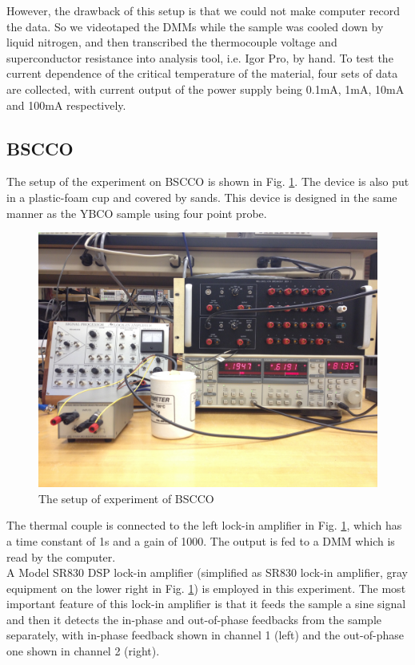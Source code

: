 \documentclass[prb,preprint]{revtex4-1}
\begin{document}
However, the drawback of this setup is that we could not make computer record the data. So we videotaped the DMMs while the sample was cooled down by liquid nitrogen, and then transcribed the thermocouple voltage and superconductor resistance into analysis tool, i.e. Igor Pro, by hand. To test the current dependence of the critical temperature of the material, four sets of data are collected, with current output of the power supply being 0.1mA, 1mA, 10mA and 100mA respectively.\\

\subsection{BSCCO}

The setup of the experiment on BSCCO is shown in Fig. \ref{bsccosetup}. The device is also put in a plastic-foam cup and covered by sands. This device is designed in the same manner as the YBCO sample using four point probe.

\begin{figure}[h]
\centering
\includegraphics[width=14cm]{bsccosetup.jpg}
\caption{The setup of experiment of BSCCO}
\label{bsccosetup}
\end{figure}

The thermal couple is connected to the left lock-in amplifier in Fig. \ref{bsccosetup}, which has a time constant of 1s and a gain of 1000. The output is fed to a DMM which is read by the computer. \\

A Model SR830 DSP lock-in amplifier (simplified as SR830 lock-in amplifier, gray equipment on the lower right in Fig. \ref{bsccosetup}) is employed in this experiment. The most important feature of this lock-in amplifier is that it feeds the sample a sine signal and then it detects the in-phase and out-of-phase feedbacks from the sample separately, with in-phase feedback shown in channel 1 (left) and the out-of-phase one shown in channel 2 (right). \\
\end{document}
